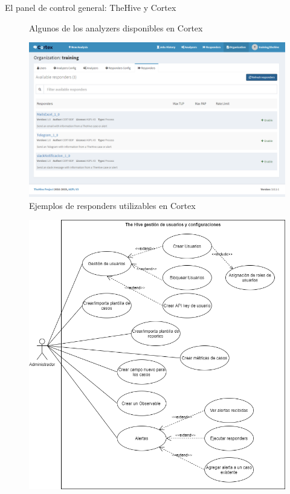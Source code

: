 \begin{subsection}{El panel de control general: TheHive y Cortex}
\begin{figure}[H]
        \caption{Algunos de los analyzers disponibles en Cortex}
        \label{fig:analizers_disponibles}
     \end{figure}
     \begin{figure}[H]
        \centering
        \includegraphics[width=1\textwidth]{./iteracion_1_imagenes/figura_27_responders_cortex.png}
        \caption{Ejemplos de responders utilizables en Cortex}
        \label{fig:ejemplos_responders_cortex}
     \end{figure}
     \begin{figure}[H]
        \centering
        \includegraphics[width=1\textwidth]{./iteracion_1_imagenes/figura_28_thehive_user_conf.png}

\end{figure}
\end{subsection}
